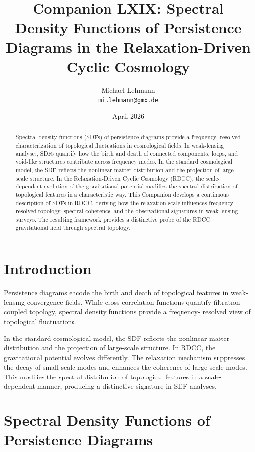 \documentclass[11pt,a4paper]{article}
\title{\textbf{Companion LXIX: Spectral Density Functions of Persistence Diagrams in the Relaxation-Driven Cyclic Cosmology}}
\author{Michael Lehmann \\ \texttt{mi.lehmann@gmx.de}}
\date{April 2026}
\begin{document}
\maketitle

\begin{abstract}
Spectral density functions (SDFs) of persistence diagrams provide a frequency-
resolved characterization of topological fluctuations in cosmological fields. In 
weak-lensing analyses, SDFs quantify how the birth and death of connected 
components, loops, and void-like structures contribute across frequency modes. In 
the standard cosmological model, the SDF reflects the nonlinear matter distribution 
and the projection of large-scale structure. In the Relaxation-Driven Cyclic 
Cosmology (RDCC), the scale-dependent evolution of the gravitational potential 
modifies the spectral distribution of topological features in a characteristic way. 
This Companion develops a continuous description of SDFs in RDCC, deriving how the 
relaxation scale influences frequency-resolved topology, spectral coherence, and 
the observational signatures in weak-lensing surveys. The resulting framework 
provides a distinctive probe of the RDCC gravitational field through spectral 
topology.
\end{abstract}
\section{Introduction}

Persistence diagrams encode the birth and death of topological features in 
weak-lensing convergence fields. While cross-correlation functions quantify 
filtration-coupled topology, spectral density functions provide a frequency-
resolved view of topological fluctuations.

In the standard cosmological model, the SDF reflects the nonlinear matter 
distribution and the projection of large-scale structure. In RDCC, the 
gravitational potential evolves differently. The relaxation mechanism suppresses 
the decay of small-scale modes and enhances the coherence of large-scale modes. 
This modifies the spectral distribution of topological features in a scale-
dependent manner, producing a distinctive signature in SDF analyses.
\section{Spectral Density Functions of Persistence Diagrams}
\end{document}
